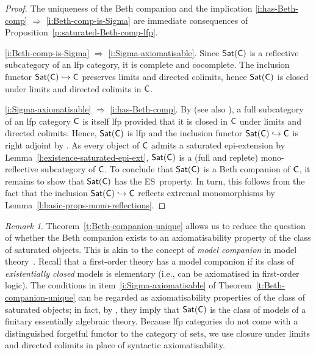 \documentclass[a4paper,10pt,reqno]{amsart}
\theoremstyle{definition}
\theoremstyle{remark}
\newtheorem{remark}[theorem]{Remark}
\newcommand{\cat}{{\sf C}}								%
\newcommand{\Sat}{{\sf Sat}}								%
\newcommand{\into}{\hookrightarrow}						%
\newcommand{\IMP}{\Rightarrow}						%
\newcommand{\ES}{\textnormal{ES}}
\begin{document}
\begin{proof}
The uniqueness of the Beth companion and the implication \ref{i:has-Beth-comp} $\IMP$ \ref{i:Beth-comp-is-Sigma} are immediate consequences of Proposition~\ref{p:saturated-Beth-comp-lfp}.

\ref{i:Beth-comp-is-Sigma} $\IMP$ \ref{i:Sigma-axiomatisable}. Since $\Sat(\cat)$ is a reflective subcategory of an lfp category, it is complete and cocomplete. 
%
The inclusion functor $\Sat(\cat)\into\cat$ preserves limits and directed colimits, hence $\Sat(\cat)$ is closed under limits and directed colimits in $\cat$.

\ref{i:Sigma-axiomatisable} $\IMP$ \ref{i:has-Beth-comp}. By \cite[Corollary~2.4]{MP1987} (see also \cite[Corollary~2.48]{ar94book}), a full subcategory of an lfp category $\cat$ is itself lfp provided that it is closed in $\cat$ under limits and directed colimits. Hence, $\Sat(\cat)$ is lfp and the inclusion functor $\Sat(\cat)\into\cat$ is right adjoint by \cite[Theorem~1.66]{ar94book}. As every object of $\cat$ admits a saturated epi-extension by Lemma~\ref{l:existence-saturated-epi-ext}, $\Sat(\cat)$ is a (full and replete) mono-reflective subcategory of $\cat$. To conclude that $\Sat(\cat)$ is a Beth companion of $\cat$, it remains to show that $\Sat(\cat)$ has the \ES~property. In turn, this follows from the fact that the inclusion $\Sat(\cat)\into \cat$ reflects extremal monomorphisms by Lemma~\ref{l:basic-props-mono-reflections}.
\end{proof}

\begin{remark}\label{rmk:axiomatisability-Beth-comp}
Theorem~\ref{t:Beth-companion-unique} allows us to reduce the question of whether the Beth companion exists to an axiomatisability property of the class of saturated objects. This is akin to the concept of \emph{model companion} in model theory~\cite{Rob77}. Recall that a first-order theory has a model companion if its class of \emph{existentially closed} models is elementary (i.e., can be axiomatised in first-order logic). The conditions in item~\ref{i:Sigma-axiomatisable} of Theorem~\ref{t:Beth-companion-unique} can be regarded as axiomatisability properties of the class of saturated objects; in fact, by \cite[Corollary~2.4]{MP1987}, they imply that $\Sat(\cat)$ is the class of models of a finitary essentially algebraic theory. Because lfp categories do not come with a distinguished forgetful functor to the category of sets, we use closure under limits and directed colimits in place of  syntactic axiomatisability.
\end{remark}
\end{document}
